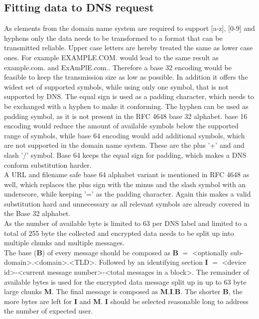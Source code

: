     \subsection{Fitting data to DNS request}
        \label{subsec:software_design:fitting}
        As elements from the domain name system are required to support [a-z], [0-9] and hyphens only the data needs to be transformed to a format that can be transmitted reliable. Upper case letters are hereby treated the same as lower case ones.
        For example EXAMPLE.COM. would lead to the same result as example.com. and ExAmPlE.com..
        Therefore a base 32 encoding would be feasible to keep the transmission size as low as possible. In addition it offers the widest set of supported symbols, while using only one symbol, that is not supported by DNS. The equal sign is used as a padding character, which needs to be exchanged with a hyphen to make it conforming. The hyphen can be used as padding symbol, as it is not present in the RFC 4648 base 32 alphabet\cite{josefsson_simonjosefssonorg_base16_2006}. base 16 encoding would reduce the amount of available symbols below the supported range of symbols, while base 64 encoding would add additional symbols, which are not supported in the domain name system. These are the plus '+' and and slash '/' symbol. Base 64 keeps the equal sign for padding, which makes a DNS conform substitution harder.\\
        A URL and filename safe base 64 alphabet variant is mentioned in RFC 4648 as well, which replaces the plus sign with the minus and the slash symbol with an underscore, while keeping '=' as the padding character. Again this makes a valid substitution hard and unnecessary as all relevant symbols are already covered in the Base 32 alphabet\cite{josefsson_simonjosefssonorg_base16_2006}.\\
        
        As the number of available byte is limited to 63 per DNS label and limited to a total of 255 byte the collected and encrypted data needs to be split up into multiple chunks and multiple messages.\\
        The base (\textbf{B}) of every message should be composed as \textbf{B} $=$ <optionally sub-domain>.<domain>.<TLD>.
        Followed by an identifying section \textbf{I} $=$ <device id>-<current message number>-<total messages in a block>. 
        The remainder of available bytes is used for the encrypted data message split up in up to 63 byte large chunks \textbf{M}.
        The final message is composed as \textbf{M}.\textbf{I}.\textbf{B}. The shorter \textbf{B}, the more bytes are left for \textbf{I} and \textbf{M}. \textbf{I} should be selected reasonable long to address the number of expected user.\\
        
